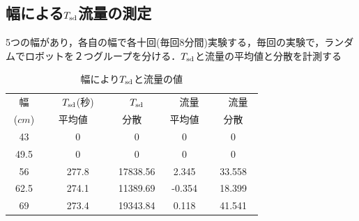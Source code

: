 \documentclass[twocolumn]{jarticle} %
\begin{document}
\subsection{幅による$T_{\rm sd}$流量の測定}
5つの幅があり，各自の幅で各十回(毎回8分間)実験する，毎回の実験で，ランダムでロボットを２つグループを分ける．$T_{\rm sd}$と流量の平均値と分散を計測する
\begin{table}[!ht]
\begin{center}
\begin{tabular}{|c|c|c|c|c|}
\hline
幅　&　$T_{\rm sd}$(秒)　&　$T_{\rm sd}$　&　流量　&　流量　\\
($cm$)   &   平均値 & 分散 & 平均値 & 分散 \\
\hline
43　&　0　&　0 & 0 & 0 \\
\hline
49.5　&　0　&　0 & 0 & 0 \\
\hline
56　&　277.8　&　17838.56 & 2.345 & 33.558 \\
\hline
62.5　&　274.1　&　11389.69 & -0.354 & 18.399 \\
\hline
69　&　273.4　&　19343.84 & 0.118 & 41.541 \\
\hline
\end{tabular}
\end{center}
\caption{
幅により$T_{\rm sd}$と流量の値
}
\end{table}
\end{document}
